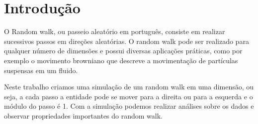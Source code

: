 
\chapter{Introdução}
\label{chap_introducao}

O Random walk, ou passeio aleatório em português, consiste em realizar sucessivos passos em direções aleatórias. O random walk pode ser realizado para qualquer número de dimensões e possui diversas aplicações práticas, como por exemplo o movimento browniano que descreve a movimentação de partículas suspensas em um fluido.

Neste trabalho criamos uma simulação de um random walk em uma dimensão, ou seja, a cada passo a entidade pode se mover para a direita ou para a esquerda e o módulo do passo é 1. Com a simulação podemos realizar análises sobre os dados e observar propriedades importantes do random walk.